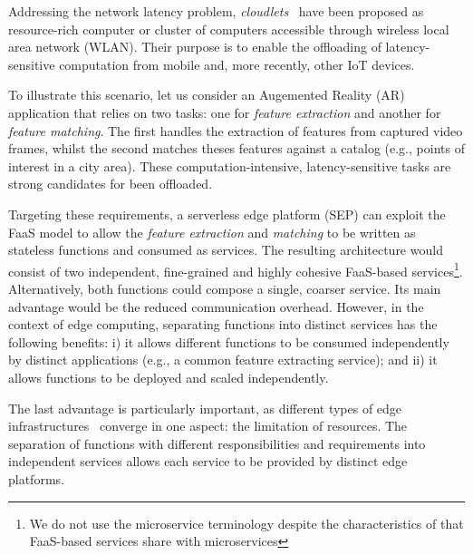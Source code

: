 \documentclass[letterpaper, 10 pt, conference]{ieeeconf}  %
\begin{document}
Addressing the network latency problem, \textit{cloudlets}~\cite{Satyanarayanan:2009} have been proposed as resource-rich computer or cluster of computers  accessible through wireless local area network (WLAN). Their purpose is to enable the offloading of latency-sensitive computation from mobile  and, more recently, other IoT devices. 


To illustrate this scenario, let us consider an Augemented Reality (AR) application that relies on two tasks: one for \textit{feature extraction} and another for \textit{feature matching}. The first handles the extraction of features from captured video frames, whilst the second matches theses features against a catalog (e.g., points of interest in a city area). 
These computation-intensive, latency-sensitive tasks are strong candidates for been offloaded.

Targeting these requirements, a serverless edge platform (SEP) can exploit the FaaS model to allow the \textit{feature extraction} and \textit{matching} to be written as stateless functions and consumed as services. The resulting architecture would consist of two independent, fine-grained and highly cohesive FaaS-based services\footnote{We do not use the microservice terminology despite the characteristics of that FaaS-based services share with microservices}. Alternatively, both functions could compose a single, coarser service. Its main advantage would be the reduced communication overhead. However, in the context of edge computing, separating functions into distinct services has the following benefits: i) it allows different functions to be consumed independently by distinct applications (e.g., a common feature extracting service); and ii) it allows functions to be deployed and scaled independently.%


The last advantage is particularly important, as different types of edge infrastructures~\cite{Satyanarayanan:2009,Taleb:2013,Liu:2014,K.Wang:2015} converge in one aspect: the limitation of resources. The separation of functions with different responsibilities and requirements into independent services allows each service to be provided by distinct edge platforms. 
\end{document}
